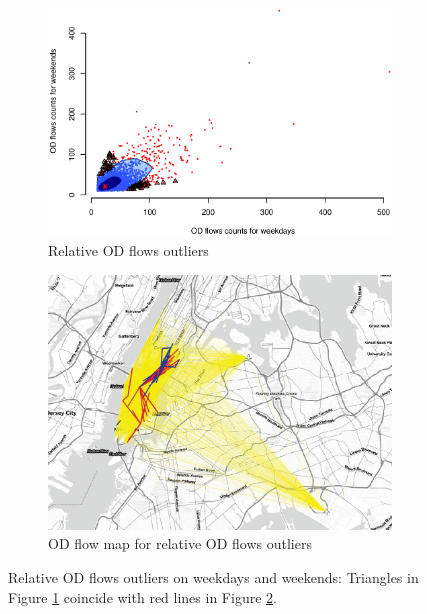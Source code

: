 \documentclass[a4paper,UKenglish]{lipics-v2016}
\providecommand{\DIFaddbeginFL}{} %
\providecommand{\DIFaddendFL}{} %
\providecommand{\DIFdelbeginFL}{} %
\providecommand{\DIFdelendFL}{} %
\begin{document}
\begin{figure}
	\centering
	\begin{subfigure}[b]{0.49\textwidth}
		\includegraphics[width=\textwidth]{images/Outliers_rare_weekdays_weekends.eps}
		\caption{Relative OD flows outliers}
		\label{fig:weekdays_rare}
	\end{subfigure}
	\hfill %
	\begin{subfigure}[b]{0.49\textwidth}
		\DIFdelbeginFL %
\DIFdelendFL \DIFaddbeginFL \includegraphics[width=\textwidth]{images/outliers_rare2_weekdays_weekends.eps}
		\DIFaddendFL \caption{OD flow map for relative OD flows outliers}
		\label{fig:weekdays_rare_map}
	\end{subfigure}
	\caption{Relative OD flows outliers on weekdays and weekends: Triangles in Figure \ref{fig:weekdays_rare} coincide with red lines in Figure \ref{fig:weekdays_rare_map}. }\label{fig:weekdays_rare_OD_map}	
\end{figure}
\end{document}
